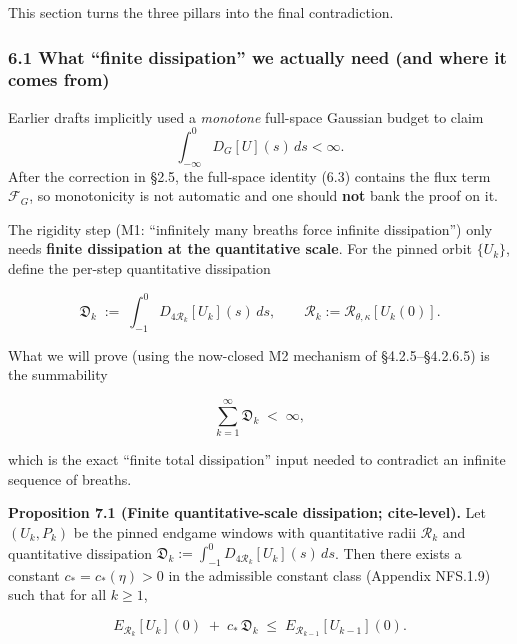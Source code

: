 \documentclass[
  11pt,
]{article}
\begin{document}
This section turns the three pillars into the final contradiction.

\hypertarget{what-finite-dissipation-we-actually-need-and-where-it-comes-from}{%
\subsubsection{6.1 What ``finite dissipation'' we actually need (and where it comes from)}\label{what-finite-dissipation-we-actually-need-and-where-it-comes-from}}

Earlier drafts implicitly used a \emph{monotone} full-space Gaussian budget to claim \[
\int_{-\infty}^{0}D_G[U](s)\,ds<\infty.
\] After the correction in §2.5, the full-space identity (6.3) contains the flux term \(\mathcal F_G\), so monotonicity is not automatic and one should \textbf{not} bank the proof on it.

The rigidity step (M1: ``infinitely many breaths force infinite dissipation'') only needs \textbf{finite dissipation at the quantitative scale}. For the pinned orbit \(\{U_k\}\), define the per-step quantitative dissipation

\begin{equation}
\mathfrak D_k \;:=\;\int_{-1}^{0} D_{4\mathcal R_k}[U_k](s)\,ds,
\qquad \mathcal R_k:=\mathcal R_{\theta,\kappa}[U_k(0)].
\tag{7.1}
\end{equation}

What we will prove (using the now-closed M2 mechanism of §4.2.5--§4.2.6.5) is the summability

\begin{equation}
\sum_{k=1}^{\infty}\mathfrak D_k \;<\;\infty,
\tag{7.2}\label{eq:7.2}
\end{equation}

which is the exact ``finite total dissipation'' input needed to contradict an infinite sequence of breaths.

\textbf{Proposition 7.1 (Finite quantitative-scale dissipation; cite-level).} Let \((U_k,P_k)\) be the pinned endgame windows with quantitative radii \(\mathcal R_k\) and quantitative dissipation \(\mathfrak D_k:=\int_{-1}^{0}D_{4\mathcal R_k}[U_k](s)\,ds\). Then there exists a constant \(c_*=c_*(\eta)>0\) in the admissible constant class (Appendix NFS.1.9) such that for all \(k\ge 1\),

\begin{equation}
E_{\mathcal R_k}[U_k](0)\;+\;c_*\,\mathfrak D_k
\;\le\;E_{\mathcal R_{k-1}}[U_{k-1}](0).
\tag{7.3}
\end{equation}
\end{document}

